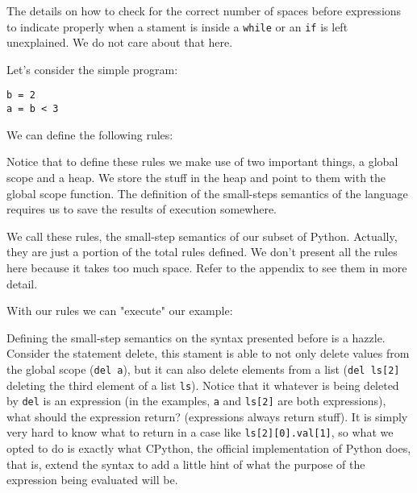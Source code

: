 The details on how to check for the correct number of spaces before expressions to
indicate properly when a stament is inside a \texttt{while} or an \texttt{if} is left
unexplained. We do not care about that here.

Let's consider the simple program:

\begin{verbatim}
b = 2
a = b < 3
\end{verbatim}

We can define the following rules:


Notice that to define these rules we make use of two important things, a global scope and
a heap. We store the stuff in the heap and point to them with the global scope function.
The definition of the small-steps semantics of the language requires us to save the
results of execution somewhere.

We call these rules, the small-step semantics of our subset of Python. Actually, they are
just a portion of the total rules defined. We don't present all the rules here because it
takes too much space. Refer to the appendix to see them in more detail.

With our rules we can "execute" our example:



Defining the small-step semantics on the syntax presented before is a hazzle. Consider the
statement delete, this stament is able to not only delete values from the global scope
(\verb+del a+), but it can also delete elements from a list (\verb+del ls[2]+ deleting the
third element of a list \verb+ls+).  Notice that it whatever is being deleted by
\verb+del+ is an expression (in the examples, \verb+a+ and \verb+ls[2]+ are both
expressions), what should the expression return? (expressions always return stuff). It is
simply very hard to know what to return in a case like \verb+ls[2][0].val[1]+, so what we
opted to do is exactly what CPython, the official implementation of Python does, that is,
extend the syntax to add a little hint of what the purpose of the expression being
evaluated will be.


